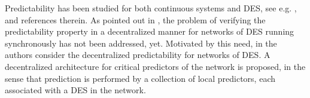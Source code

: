 \documentclass[letterpaper, 10 pt, conference]{ieeeconf}
\begin{document}
Predictability has been studied for both continuous systems and DES, see e.g. \cite{Laf:2009}, and references therein.
%
As pointed out in \cite{YIN2017199}, the problem of verifying the predictability property in a decentralized manner for networks of DES running synchronously has not been addressed, yet. Motivated by this need, in \cite{LCSS18}
 the authors consider the decentralized predictability for networks of DES. 
 A decentralized architecture for critical predictors of the network is proposed, in the sense that prediction is performed by a collection of local predictors, each associated with a DES in the network. 
\end{document}
